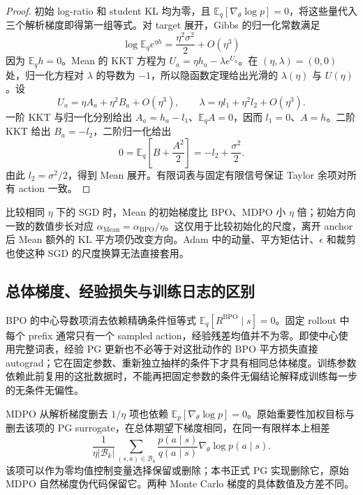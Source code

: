\documentclass[lang=cn,scheme=chinese,openany]{../book/elegantbook}
\begin{document}
\begin{proof}
初始 log-ratio 和 student KL 均为零，且 $\mathbb E_q[\nabla_\theta\log p]=0$，将这些量代入三个解析梯度即得第一组等式。对 target 展开，Gibbs 的归一化常数满足
\begin{equation*}
 \log\mathbb E_qe^{\eta h}=\frac{\eta^2\sigma^2}{2}+O(\eta^3)
\end{equation*}
因为 $\mathbb E_qh=0$。Mean 的 KKT 方程为 $U_a=\eta h_a-\lambda e^{U_a}$。在 $(\eta,\lambda)=(0,0)$ 处，归一化方程对 $\lambda$ 的导数为 $-1$，所以隐函数定理给出光滑的 $\lambda(\eta)$ 与 $U(\eta)$。设
\begin{equation*}
 U_a=\eta A_a+\eta^2B_a+O(\eta^3),\qquad
 \lambda=\eta l_1+\eta^2l_2+O(\eta^3).
\end{equation*}
一阶 KKT 与归一化分别给出 $A_a=h_a-l_1$、$\mathbb E_qA=0$，因而 $l_1=0$、$A=h$。二阶 KKT 给出 $B_a=-l_2$，二阶归一化给出
\begin{equation*}
 0=\mathbb E_q\left[B+\frac{A^2}{2}\right]=-l_2+\frac{\sigma^2}{2}.
\end{equation*}
由此 $l_2=\sigma^2/2$，得到 Mean 展开。有限词表与固定有限信号保证 Taylor 余项对所有 action 一致。
\end{proof}

比较相同 $\eta$ 下的 SGD 时，Mean 的初始梯度比 BPO、MDPO 小 $\eta$ 倍；初始方向一致的数值步长对应 $\alpha_{\mathrm{Mean}}=\alpha_{\mathrm{BPO}}/\eta$。这仅用于比较初始化的尺度，离开 anchor 后 Mean 额外的 KL 平方项仍改变方向。Adam 中的动量、平方矩估计、$\epsilon$ 和裁剪也使这种 SGD 的尺度换算无法直接套用。

\subsection{总体梯度、经验损失与训练日志的区别}
\label{subsec:ch2-population-empirical-surrogate}

BPO 的中心导数项消去依赖精确条件恒等式 $\mathbb E_q[R^{\mathrm{BPO}}\mid s]=0$。固定 rollout 中每个 prefix 通常只有一个 sampled action，经验残差均值并不为零。即使中心使用完整词表，经验 PG 更新也不必等于对这批动作的 BPO 平方损失直接 autograd；它在固定参数、重新独立抽样的条件下才具有相同总体梯度。训练参数依赖此前复用的这批数据时，不能再把固定参数的条件无偏结论解释成训练每一步的无条件无偏性。

MDPO 从解析梯度删去 $1/\eta$ 项也依赖 $\mathbb E_{p}[\nabla_\theta\log p]=0$。原始重要性加权目标与删去该项的 PG surrogate，在总体期望下梯度相同，在同一有限样本上相差
\begin{equation*}
 \frac1{\eta|\mathcal B_k|}\sum_{(s,a)\in\mathcal B_k}
 \frac{p(a\mid s)}{q(a\mid s)}\nabla_\theta\log p(a\mid s).
\end{equation*}
该项可以作为零均值控制变量选择保留或删除；本书正式 PG 实现删除它，原始 MDPO 自然梯度伪代码保留它。两种 Monte Carlo 梯度的具体数值及方差不同。
\end{document}
